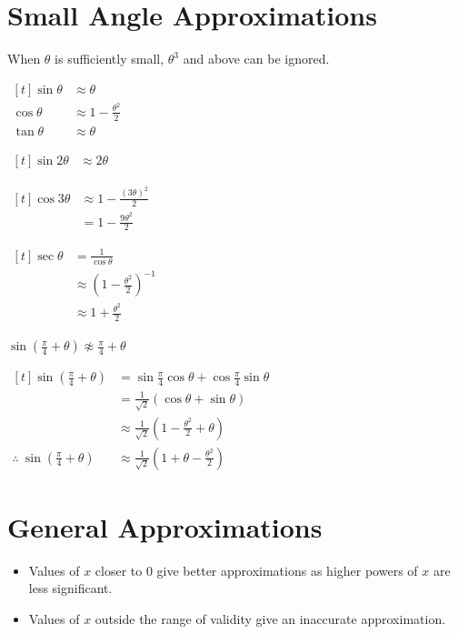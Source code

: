 \documentclass[a4paper,11pt,oneside]{book}
\providecommand{\cdisp}[1]{\par\noindent$\displaystyle\begin{aligned}[t]#1\end{aligned}$\par\smallskip}
\renewcommand{\cdisp}[1]{\par\noindent\hfill$\displaystyle\begin{aligned}[t]#1\end{aligned}$\hfill\null\par\smallskip}
\begin{document}
\section{Small Angle Approximations}
When $\theta$ is sufficiently small, $\theta^{3}$ and above can be ignored.
\cdisp{\sin\theta&\approx\theta\\\cos\theta&\approx1-\frac{\theta^{2}}{2}\\\tan\theta&\approx\theta}
\exlab
\cdisp{\sin2\theta&\approx2\theta}
\exlab
\cdisp{\cos3\theta&\approx1-\frac{(3\theta)^{2}}{2}\\&=1-\frac{9\theta^{2}}{2}}
\exlab
\cdisp{\sec\theta&=\frac{1}{\cos\theta}\\&\approx\left(1-\frac{\theta^{2}}{2}\right)^{-1}\\&\approx1+\frac{\theta^{2}}{2}}
\exlab
$\sin\left(\frac{\pi}{4}+\theta\right)\not\approx\frac{\pi}{4}+\theta$
\cdisp{\sin\left(\frac{\pi}{4}+\theta\right)&=\sin\frac{\pi}{4}\cos\theta+\cos\frac{\pi}{4}\sin\theta\\&=\frac{1}{\sqrt{2}}\left(\cos\theta+\sin\theta\right)\\&\approx\frac{1}{\sqrt{2}}\left(1-\frac{\theta^{2}}{2}+\theta\right)\\\therefore\ \sin\left(\frac{\pi}{4}+\theta\right)&\approx\frac{1}{\sqrt{2}}\left(1+\theta-\frac{\theta^{2}}{2}\right)}
\section{General Approximations}
\begin{itemize}
\item Values of $x$ closer to 0 give better approximations as higher powers of $x$ are less significant.
\item Values of $x$ outside the range of validity give an inaccurate approximation.
\end{itemize}





\end{document}
